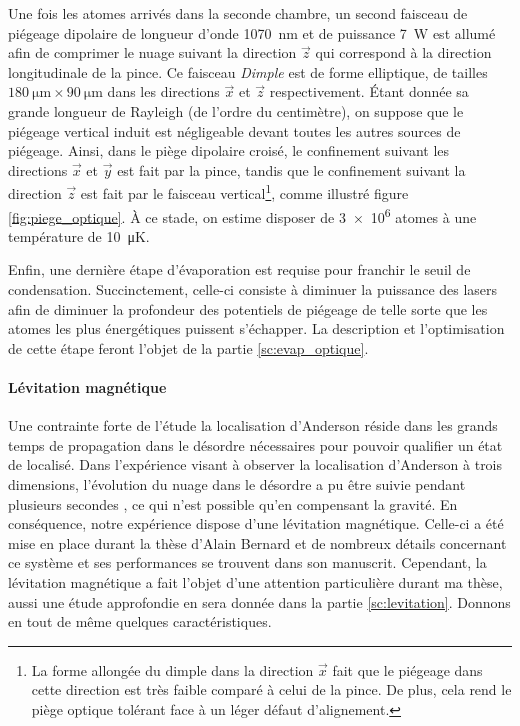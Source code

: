 Une fois les atomes arrivés dans la seconde chambre, un second faisceau de piégeage dipolaire de longueur d'onde \SI{1070}{\nano\metre} et de puissance \SI{7}{\watt} est allumé afin de comprimer le nuage suivant la direction $\vec{z}$ qui correspond à la direction longitudinale de la pince. Ce faisceau \emph{Dimple} est de forme elliptique, de tailles $\SI{180}{\micro\metre} \times \SI{90}{\micro\metre}$ dans les directions $\vec{x}$ et $\vec{z}$ respectivement. Étant donnée sa grande longueur de Rayleigh (de l'ordre du centimètre), on suppose que le piégeage vertical induit est négligeable devant toutes les autres sources de piégeage. Ainsi, dans le piège dipolaire croisé, le confinement suivant les directions $\vec{x}$ et $\vec{y}$ est fait par la pince, tandis que le confinement suivant la direction $\vec{z}$ est fait par le faisceau vertical\footnote{La forme allongée du dimple dans la direction $\vec{x}$ fait que le piégeage dans cette direction est très faible comparé à celui de la pince. De plus, cela rend le piège optique tolérant face à un léger défaut d'alignement.}, comme illustré figure \ref{fig:piege_optique}. À ce stade, on estime disposer de \num{3e6} atomes à une température de \SI{10}{\micro\kelvin}.

Enfin, une dernière étape d'évaporation est requise pour franchir le seuil de condensation. Succinctement, celle-ci consiste à diminuer la puissance des lasers afin de diminuer la profondeur des potentiels de piégeage de telle sorte que les atomes les plus énergétiques puissent s'échapper. La description et l'optimisation de cette étape feront l'objet de la partie \ref{sc:evap_optique}.



\paragraph*{Lévitation magnétique}
Une contrainte forte de l'étude la localisation d'Anderson réside dans les grands temps de propagation dans le désordre nécessaires pour pouvoir qualifier un état de localisé. Dans l'expérience visant à observer la localisation d'Anderson à trois dimensions, l'évolution du nuage dans le désordre a pu être suivie pendant plusieurs secondes \citep{jendrzejewski2012three}, ce qui n'est possible qu'en compensant la gravité. En conséquence, notre expérience dispose d'une lévitation magnétique. Celle-ci a été mise en place durant la thèse d'Alain Bernard et de nombreux détails concernant ce système et ses performances se trouvent dans son manuscrit. Cependant, la lévitation magnétique a fait l'objet d'une attention particulière durant ma thèse, aussi une étude approfondie en sera donnée dans la partie \ref{sc:levitation}. Donnons en tout de même quelques caractéristiques.

